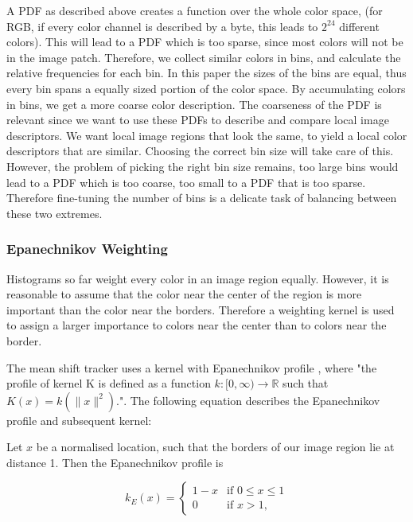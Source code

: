 \documentclass[a4paper,11pt]{article}
\begin{document}
A PDF as described above creates a function over the whole color space, (for RGB, if every color channel is described by a byte, this leads to $2^{24}$ different colors). This will lead to a PDF which is too sparse, since most colors will not be in the image patch. Therefore, we collect similar colors in bins, and calculate the relative frequencies for each bin. In this paper the sizes of the bins are equal, thus every bin spans a equally sized portion of the color space. By accumulating colors in bins, we get a more coarse color description. The coarseness of the PDF is relevant since we want to use these PDFs to describe and compare local image descriptors. We want local image regions that look the same, to yield a local color descriptors that are similar.  Choosing the correct bin size will take care of this. However, the problem of picking the right bin size remains, too large bins would lead to a PDF which is too coarse, too small to a PDF that is too sparse. Therefore fine-tuning the number of bins is a delicate task of balancing between these two extremes. 



\subsubsection{Epanechnikov Weighting}

Histograms so far weight every color in an image region equally. However, it is reasonable to assume that the color near the center of the region is more important than the color near the borders. Therefore a weighting kernel is used to assign a larger importance to colors near the center than to colors near the border.



The mean shift tracker uses a kernel with Epanechnikov profile \cite{mean_shift_epan}, where "the profile of kernel K is defined as a function $k:[0,\infty)\rightarrow\mathbb{R}$ such that $K(x)=k(\|x\|^2)$."\cite{mean_shift}. The following equation describes the Epanechnikov profile and subsequent kernel: 



Let $x$ be a normalised location, such that the borders of our image region lie at distance 1. Then the Epanechnikov profile is



\begin{equation}
\label{eq:epanechnikov_profile}
k_E(x) = \left\{ \begin{array}{cl}
  1-x & \textrm{if } 0 \leq x \leq 1\\
  0 & \textrm{if }  x > 1 ,\end{array}\right.
\end{equation}
\end{document}
